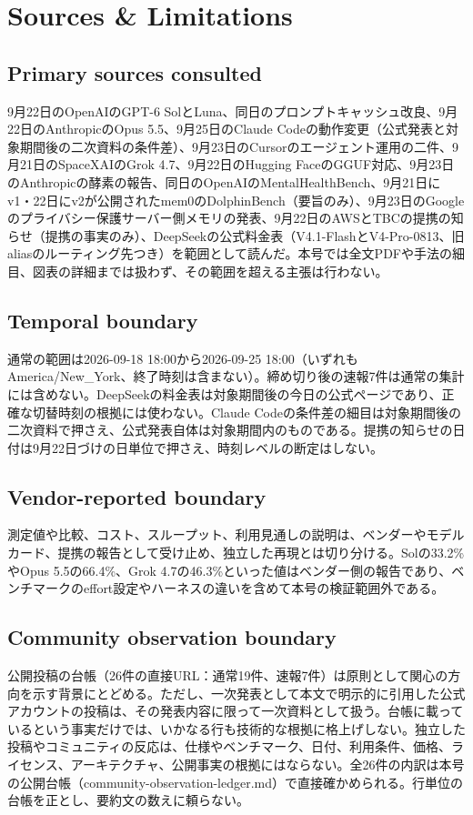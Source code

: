 \section*{Sources \& Limitations}

\subsection*{Primary sources consulted}
9月22日のOpenAIのGPT-6 SolとLuna、同日のプロンプトキャッシュ改良、9月22日のAnthropicのOpus 5.5、9月25日のClaude Codeの動作変更（公式発表と対象期間後の二次資料の条件差）、9月23日のCursorのエージェント運用の二件、9月21日のSpaceXAIのGrok 4.7、9月22日のHugging FaceのGGUF対応、9月23日のAnthropicの酵素の報告、同日のOpenAIのMentalHealthBench、9月21日にv1・22日にv2が公開されたmem0のDolphinBench（要旨のみ）、9月23日のGoogleのプライバシー保護サーバー側メモリの発表、9月22日のAWSとTBCの提携の知らせ（提携の事実のみ）、DeepSeekの公式料金表（V4.1-FlashとV4-Pro-0813、旧aliasのルーティング先つき）を範囲として読んだ。本号では全文PDFや手法の細目、図表の詳細までは扱わず、その範囲を超える主張は行わない。

\subsection*{Temporal boundary}
通常の範囲は2026-09-18 18:00から2026-09-25 18:00（いずれもAmerica/New\_York、終了時刻は含まない）。締め切り後の速報7件は通常の集計には含めない。DeepSeekの料金表は対象期間後の今日の公式ページであり、正確な切替時刻の根拠には使わない。Claude Codeの条件差の細目は対象期間後の二次資料で押さえ、公式発表自体は対象期間内のものである。提携の知らせの日付は9月22日づけの日単位で押さえ、時刻レベルの断定はしない。

\subsection*{Vendor-reported boundary}
測定値や比較、コスト、スループット、利用見通しの説明は、ベンダーやモデルカード、提携の報告として受け止め、独立した再現とは切り分ける。Solの33.2\%やOpus 5.5の66.4\%、Grok 4.7の46.3\%といった値はベンダー側の報告であり、ベンチマークのeffort設定やハーネスの違いを含めて本号の検証範囲外である。

\subsection*{Community observation boundary}
公開投稿の台帳（26件の直接URL：通常19件、速報7件）は原則として関心の方向を示す背景にとどめる。ただし、一次発表として本文で明示的に引用した公式アカウントの投稿は、その発表内容に限って一次資料として扱う。台帳に載っているという事実だけでは、いかなる行も技術的な根拠に格上げしない。独立した投稿やコミュニティの反応は、仕様やベンチマーク、日付、利用条件、価格、ライセンス、アーキテクチャ、公開事実の根拠にはならない。全26件の内訳は本号の公開台帳（community-observation-ledger.md）で直接確かめられる。行単位の台帳を正とし、要約文の数えに頼らない。

